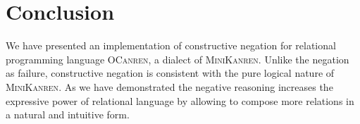 \section{Conclusion}

\label{sec:conclusion}

We have presented an implementation of constructive negation
for relational programming language \textsc{OCanren}, a dialect of \textsc{MiniKanren}.
Unlike the negation as failure,
constructive negation is consistent with 
the pure logical nature of \textsc{MiniKanren}.
As we have demonstrated the negative reasoning 
increases the expressive power of relational language
by allowing to compose more relations in a natural and intuitive form.
